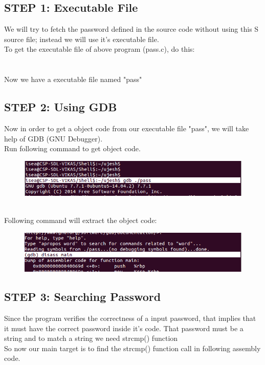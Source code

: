 \documentclass[12pt]{article}
\begin{document}
\subsection {STEP 1: Executable File}
We will try to fetch the password defined in the source code without using this S source file; instead we will use it's executable file.\\
To get the executable file of above program (pass.c), do this:\\
\\\\
Now we have a executable file named "pass"

\subsection {STEP 2: Using GDB}
Now in order to get a object code from our executable file "pass", we will take help of GDB (GNU Debugger).\\
Run following command to get object code.\\

\begin{figure}[ht!]
			\centering
			\includegraphics[width=120mm]{dbgcmd.png}
			
		\end{figure}
\\
Following command will extract the object code:\\
\begin{figure}[ht!]
	\centering
	\includegraphics[width=120mm]{gdbass.png}
	
\end{figure}
   
\subsection {STEP 3: Searching Password}
Since the program verifies the correctness of a input password, that implies that it must have the correct password inside it's code.
That password must be a string and to match a string we need strcmp() function\\
So now our main target is to find the strcmp() function call in following assembly code.
\end{document}
